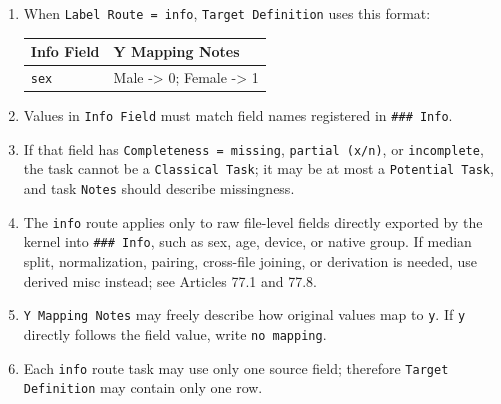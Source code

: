 \begin{tcolorbox}
\begin{enumerate}[leftmargin=1.5em,noitemsep,topsep=2pt]
\item When \texttt{Label Route = info}, \texttt{Target Definition} uses this format:
\begingroup\footnotesize
\begin{tabular}{@{}p{}p{}@{}}
\toprule
\textbf{Info Field} & \textbf{Y Mapping Notes} \\
\midrule
\texttt{sex} & Male -> 0; Female -> 1 \\
\bottomrule
\end{tabular}
\endgroup
\item Values in \texttt{Info Field} must match field names registered in \texttt{\#\#\# Info}.
\item If that field has \texttt{Completeness = missing}, \texttt{partial (x/n)}, or \texttt{incomplete}, the task cannot be a \texttt{Classical Task}; it may be at most a \texttt{Potential Task}, and task \texttt{Notes} should describe missingness.
\item The \texttt{info} route applies only to raw file-level fields directly exported by the kernel into \texttt{\#\#\# Info}, such as sex, age, device, or native group. If median split, normalization, pairing, cross-file joining, or derivation is needed, use derived misc instead; see Articles 77.1 and 77.8.
\item \texttt{Y Mapping Notes} may freely describe how original values map to \texttt{y}. If \texttt{y} directly follows the field value, write \texttt{no mapping}.
\item Each \texttt{info} route task may use only one source field; therefore \texttt{Target Definition} may contain only one row.
\end{enumerate}

\smallskip{}\par\smallskip


\end{tcolorbox}
